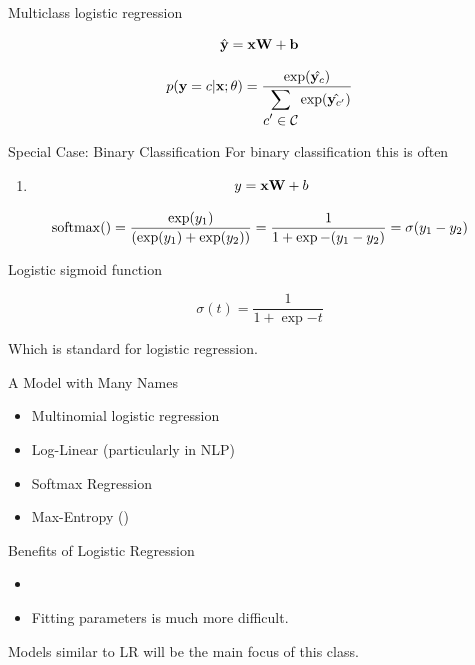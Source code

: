 \documentclass{beamer}
\begin{document}
\begin{frame}{Multiclass logistic regression}
  
  \[ \hat{\mathbf{y}} = \mathbf{x} \mathbf{W} + \mathbf{b}\] 

    \[ p(\mathbf{y} =c | \mathbf{x}; \theta) = 
      \frac{\exp(\hat{\mathbf{y}_c})}{\displaystyle \sum_{\displaystyle c' \in \mathcal{C}} \exp(\hat{\mathbf{y}_{c'}})}   \] 
\end{frame}

\begin{frame}{Special Case: Binary Classification}
  For binary classification this is often 
  \begin{enumerate}
  \item   \[y = \mathbf{x} \mathbf{W} + b\]   
  \end{enumerate}

  \[ \softmax() = \frac{\exp(y_1)}{(\exp(y_1) + \exp(y_2))} = \frac{1}{1 + \exp{-(y_1-y_2)}} = \sigma(y_1 -y_2)\]

  
  Logistic sigmoid function

  \[\sigma(t) = \frac{1}{1 + \exp{-t}} \]
  
  Which is standard for logistic regression.
\end{frame}

\begin{frame}{A Model with Many Names}
  \begin{itemize}
  \item   Multinomial logistic regression

  \item Log-Linear (particularly in NLP)

  \item  Softmax Regression

  \item Max-Entropy ()
  \end{itemize}
\end{frame}


\begin{frame}{Benefits of Logistic Regression}
  \begin{itemize}
  \item 
  \end{itemize}
  \begin{itemize}
  \item Fitting parameters is much more difficult.
  \end{itemize}
  Models similar to LR will be the main focus of this class.
\end{frame}
\end{document}

